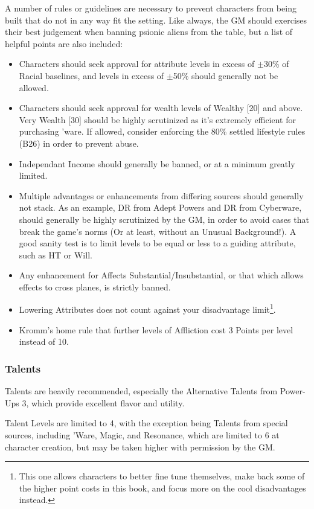 \begin{multicols*}{3}
	A number of rules or guidelines are necessary to prevent characters from being built that do not in any way fit the setting. Like always, the GM should exercises their best judgement when banning psionic aliens from the table, but a list of helpful points are also included:
	
	\begin{itemize}
		\itemsep 0pt
		\item Characters should seek approval for attribute levels in excess of \(\pm\)30\% of Racial baselines, and levels in excess of \(\pm\)50\% should generally not be allowed.
		\item Characters should seek approval for wealth levels of Wealthy [20] and above. Very Wealth [30] should be highly scrutinized as it's extremely efficient for purchasing 'ware. If allowed, consider enforcing the 80\% settled lifestyle rules (B26) in order to prevent abuse.
		\item Independant Income should generally be banned, or at a minimum greatly limited.
		\item Multiple advantages or enhancements from differing sources should generally not stack. As an example, DR from Adept Powers and DR from Cyberware, should generally be highly scrutinized by the GM, in order to avoid cases that break the game's norms (Or at least, without an Unusual Background!). A good sanity test is to limit levels to be equal or less to a guiding attribute, such as HT or Will.
		\item Any enhancement for Affects Substantial/Insubstantial, or that which allows effects to cross planes, is strictly banned.
		\item Lowering Attributes does not count against your disadvantage limit\footnote{This one allows characters to better fine tune themselves, make back some of the higher point costs in this book, and focus more on the cool disadvantages instead.}.
		\item Kromm's home rule that further levels of Affliction cost 3 Points per level instead of 10.
	\end{itemize}
	
	\subsubsection{Talents}
	
	Talents are heavily recommended, especially the Alternative Talents from Power-Ups 3, which provide excellent flavor and utility. 
	
	Talent Levels are limited to 4, with the exception being Talents from special sources, including 'Ware, Magic, and Resonance, which are limited to 6 at character creation, but may be taken higher with permission by the GM.
	

\end{multicols*}
